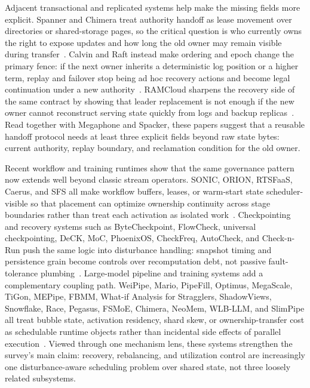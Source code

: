\documentclass[acmsmall,screen,review]{acmart}
\begin{document}
Adjacent transactional and replicated systems help make the missing fields more explicit. Spanner and Chimera treat authority handoff as lease movement over directories or shared-storage pages, so the critical question is who currently owns the right to expose updates and how long the old owner may remain visible during transfer~\cite{corbett2012spanner,huang2025chimera}. Calvin and Raft instead make ordering and epoch change the primary fence: if the next owner inherits a deterministic log position or a higher term, replay and failover stop being ad hoc recovery actions and become legal continuation under a new authority~\cite{thomson2012calvin,ongaro2014raft}. RAMCloud sharpens the recovery side of the same contract by showing that leader replacement is not enough if the new owner cannot reconstruct serving state quickly from logs and backup replicas~\cite{ousterhout2011ramcloud}. Read together with Megaphone and Spacker, these papers suggest that a reusable handoff protocol needs at least three explicit fields beyond raw state bytes: current authority, replay boundary, and reclamation condition for the old owner.

Recent workflow and training runtimes show that the same governance pattern now extends well beyond classic stream operators. SONIC, ORION, RTSFaaS, Caerus, and SFS all make workflow buffers, leases, or warm-start state scheduler-visible so that placement can optimize ownership continuity across stage boundaries rather than treat each activation as isolated work~\cite{mahgoub2021sonic,mahgoub2022orion,zhao2025rtsfaas,zhang2021caerus,fu2022sfs}. Checkpointing and recovery systems such as ByteCheckpoint, FlowCheck, universal checkpointing, DeCK, MoC, PhoenixOS, CheckFreq, AutoCheck, and Check-n-Run push the same logic into disturbance handling: snapshot timing and persistence grain become controls over recomputation debt, not passive fault-tolerance plumbing~\cite{wan2025bytecheckpoint,huang2025flowcheck,lian2025universal,gao2025deck,cai2025moc,wei2025phoenixos,mohan2021checkfreq,fu2024autocheck,eisenman2022checknrun}. Large-model pipeline and training systems add a complementary coupling path. WeiPipe, Mario, PipeFill, Optimus, MegaScale, TiGon, MEPipe, FBMM, What-if Analysis for Stragglers, ShadowViews, Snowflake, Race, Pegasus, FSMoE, Chimera, NeoMem, WLB-LLM, and SlimPipe all treat bubble state, activation residency, shard skew, or ownership-transfer cost as schedulable runtime objects rather than incidental side effects of parallel execution~\cite{lin2025weipipe,liu2025mario,arfeen2024pipefill,feng2025optimus,jiang2024megascale,huang2025tigon,sun2025mepipe,tabatabai2024fbmm,lin2025whatifstragglers,jiang2025shadowviews,vuppalapati2020snowflake,zuo2021race,li2020pegasus,fsmoe25,huang2025chimera,zhou2024neomem,wang2025wlbllm,liu2025slimpipe}. Viewed through one mechanism lens, these systems strengthen the survey's main claim: recovery, rebalancing, and utilization control are increasingly one disturbance-aware scheduling problem over shared state, not three loosely related subsystems.
\end{document}
